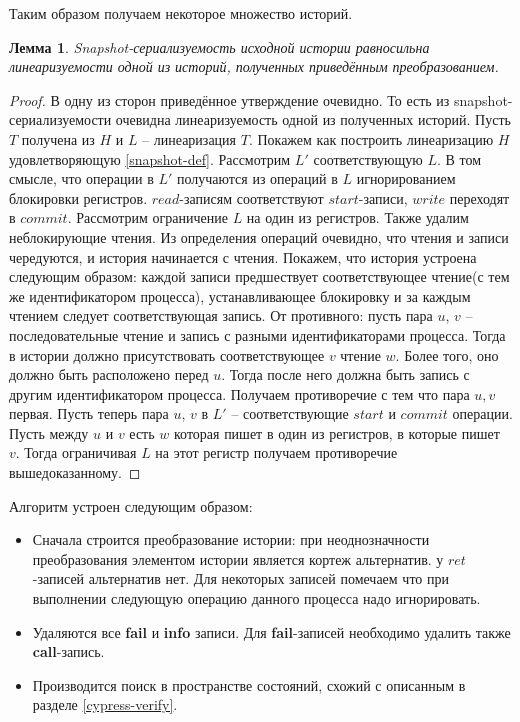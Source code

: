 \documentclass[pdftex,ptm,14pt,a4paper]{extreport}
\newtheorem{lemma}[theorem]{Лемма}
\theoremstyle{definition}
\begin{document}
Таким образом получаем некоторое множество историй.
\begin{lemma}
    Snapshot-сериализуемость исходной истории равносильна линеаризуемости одной из историй, полученных
    приведённым преобразованием.
\end{lemma}
\begin{proof}
    В одну из сторон приведённое утверждение очевидно. То есть из snapshot-сериализуемости очевидна линеаризуемость
    одной из полученных историй. Пусть $T$ получена из $H$ и $L$ -- линеаризация $T.$ Покажем как построить линеаризацию
    $H$ удовлетворяющую \ref{snapshot-def}. Рассмотрим $L'$ соответствующую $L.$ В том смысле, что операции в $L'$ получаются
    из операций в $L$ игнорированием блокировки регистров. $read$-записям соответствуют $start$-записи,
    $write$ переходят в $commit$. Рассмотрим ограничение $L$ на один из регистров. Также удалим неблокирующие чтения.
    Из определения операций очевидно, что чтения и записи чередуются, и история начинается с чтения.
    Покажем, что история устроена следующим образом: каждой записи предшествует соответствующее чтение(с тем же идентификатором
    процесса), устанавливающее блокировку и за каждым чтением следует соответствующая запись. От противного: пусть пара $u$, $v$
    -- последовательные чтение и запись с разными идентификаторами процесса. Тогда в истории должно присутствовать соответствующее
    $v$ чтение $w$. Более того, оно должно быть расположено перед $u.$ Тогда после него должна быть запись с другим идентификатором
    процесса. Получаем противоречие с тем что пара $u, v$ первая. Пусть теперь пара $u$, $v$ в $L'$ -- соответствующие $start$ и
    $commit$ операции. Пусть между $u$ и $v$ есть $w$ которая пишет в один из регистров, в которые пишет $v.$ Тогда ограничивая $L$ на
    этот регистр получаем противоречие вышедоказанному.
\end{proof}

Алгоритм устроен следующим образом:
\begin{itemize}
    \item Сначала строится преобразование истории: при неоднозначности преобразования элементом истории является кортеж альтернатив.
        у $ret$-записей альтернатив нет. Для некоторых записей помечаем что при выполнении следующую операцию
        данного процесса надо игнорировать.
    \item Удаляются все \textbf{fail} и \textbf{info} записи. Для \textbf{fail}-записей необходимо удалить также \textbf{call}-запись.
    \item Производится поиск в пространстве состояний, схожий с описанным в разделе \ref{cypress-verify}.
\end{itemize}
\end{document}
